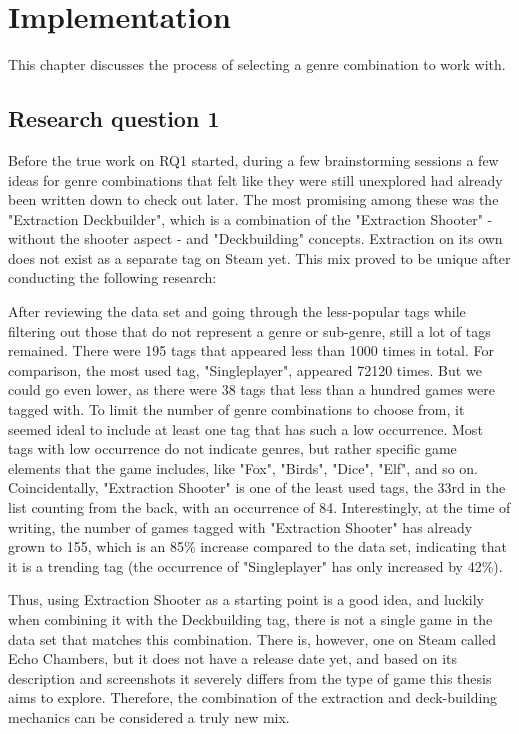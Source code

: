 \chapter{Implementation} \label{Chapter:Implementation}


This chapter discusses the process of selecting a genre combination to work with.


\section{Research question 1} %


Before the true work on RQ1 started, during a few brainstorming sessions a few ideas for genre combinations that felt like they were still unexplored had already been written down to check out later. The most promising among these was the "Extraction Deckbuilder", which is a combination of the "Extraction Shooter" - without the shooter aspect - and "Deckbuilding" concepts. Extraction on its own does not exist as a separate tag on Steam yet. This mix proved to be unique after conducting the following research:

After reviewing the data set and going through the less-popular tags while filtering out those that do not represent a genre or sub-genre, still a lot of tags remained. There were 195 tags that appeared less than 1000 times in total. For comparison, the most used tag, "Singleplayer", appeared 72120 times. But we could go even lower, as there were 38 tags that less than a hundred games were tagged with. To limit the number of genre combinations to choose from, it seemed ideal to include at least one tag that has such a low occurrence. Most tags with low occurrence do not indicate genres, but rather specific game elements that the game includes, like "Fox", "Birds", "Dice", "Elf", and so on. Coincidentally, "Extraction Shooter" is one of the least used tags, the 33rd in the list counting from the back, with an occurrence of 84. Interestingly, at the time of writing, the number of games tagged with "Extraction Shooter" has already grown to 155, which is an 85\% increase compared to the data set, indicating that it is a trending tag (the occurrence of "Singleplayer" has only increased by 42\%).

Thus, using Extraction Shooter as a starting point is a good idea, and luckily when combining it with the Deckbuilding tag, there is not a single game in the data set that matches this combination. There is, however, one on Steam called Echo Chambers, but it does not have a release date yet, and based on its description and screenshots it severely differs from the type of game this thesis aims to explore. Therefore, the combination of the extraction and deck-building mechanics can be considered a truly new mix.



